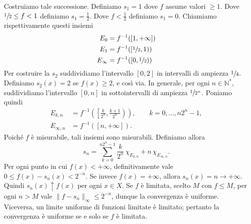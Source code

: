\documentclass[a4paper]{article}
\begin{document}
\begin{radioactive}
\begin{snippetproof}{}
\begin{figure}
\begin{center}
            \vspace{-1cm}
        \end{center}
    \end{figure}
    Costruiamo tale successione.
    Definiamo \(s_1 = 1\) dove \(f\) assume valori \(\geq 1\).
    Dove \(\sfrac12 \leq f < 1\) definiamo \(s_1 = \frac12\).
    Dove \(f < \frac12\) definiamo \(s_1 = 0\).
    Chiamiamo rispettivamente questi insiemi
    \begin{align*}
        E_0 &= f^{-1}([1, +\infty]) \\
        E_1 &= f^{-1}([\sfrac12, 1)) \\
        E_\infty &= f^{-1}([0,\sfrac12))
    \end{align*}
    Per costruire la \(s_2\) suddividiamo l'intervallo \([0,2]\)
    in intervalli di ampiezza \(\sfrac14\).
    Definiamo \(s_2(x) = 2\) se \(f(x) \geq 2\), e così via.
    In generale, per ogni \(n \in \mathbb{N}^*\), suddividiamo l'intervallo \([0,n]\)
    in sottointervalli di ampiezza \(\sfrac{1}{2^n}\).
    Poniamo quindi
    \begin{align*}
        E_{k,n} &= f^{-1}\!\left(\left[\frac{k}{2^n}, \frac{k+1}{2^n}\right)\right),
        \qquad k=0,\dots,n2^n-1, \\
        E_{\infty,n} &= f^{-1}([n,+\infty]).
    \end{align*}
    Poiché \(f\) è misurabile, tali insiemi sono misurabili.
    Definiamo allora
    \[
        s_n
        = \sum_{k=0}^{n2^n-1} \frac{k}{2^n}\,\chi_{E_{k,n}}
        + n\,\chi_{E_{\infty,n}}.
    \]
    Per ogni punto in cui \(f(x)<+\infty\), definitivamente vale
    \(0\leq f(x)-s_n(x)<2^{-n}\). Se invece \(f(x)=+\infty\), allora
    \(s_n(x)=n\to+\infty\). Quindi \(s_n(x)\uparrow f(x)\) per ogni \(x\in X\).
    Se \(f\) è limitata, scelto \(M\) con \(f\leq M\), per ogni \(n>M\) vale
    \(\lVert f-s_n\rVert_\infty\leq2^{-n}\), dunque la convergenza è uniforme.
    Viceversa, un limite uniforme di funzioni limitate è limitato; pertanto la convergenza è uniforme se e solo se \(f\) è limitata.
    \wrapfill
\end{snippetproof}
\end{radioactive}
\end{document}
